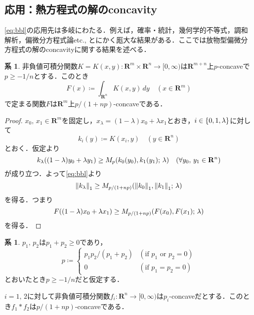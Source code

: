 \documentclass[a4j]{ltjsarticle}
\newcommand{\Rset}{\mathbf{R}}
\newcommand{\1}{\bm{1}}
\newcommand{\M}[4]{M_{#1}\qty(#2,#3;\,#4)}
\numberwithin{equation}{section}
\theoremstyle{definition}
\newtheorem{cor}[thm]{系}
\begin{document}
\subsection{応用：熱方程式の解のconcavity}
\eqref{eq:bbl}の応用先は多岐にわたる．例えば，確率・統計，幾何学的不等式，調和解析，偏微分方程式論etc., とにかく厖大な結果がある．ここでは放物型偏微分方程式の解のconcavityに関する結果を述べる．
\begin{cor}\label{cor:marginal_concavity}
    非負値可積分関数$K=K(x,y)\colon \Rset^m\times \Rset^n\to [0,\infty)$は$\Rset^{m+n}$上$p$-concaveで$p\geq -1/n$とする．このとき
    \begin{equation}
        F(x)\coloneqq \int_{\Rset^n}K(x,y)\,dy\quad (x\in\Rset^m)
    \end{equation}
    で定まる関数$F$は$\Rset^m$上$p/(1+np)$-concaveである．
\end{cor}
\begin{proof}
    $x_0,\,x_1\in \Rset^m$を固定し，$x_\lambda=(1-\lambda)x_0+\lambda x_1$とおき，$i\in \qty{0,1,\lambda}$に対して
    \begin{equation}
        k_i(y)\coloneqq K(x_i,y)\quad (y\in\Rset^n)
    \end{equation}
    とおく．仮定より
    \begin{equation}
        k_{\lambda}((1-\lambda)y_0+\lambda y_1)\geq \M{p}{k_0(y_0)}{k_1(y_1)}{\lambda}\quad (\forall y_0,\,y_1\in\Rset^n)
    \end{equation}
    が成り立つ．よって\eqref{eq:bbl}より
    \begin{equation}
        \norm{k_\lambda}_{1}\geq \M{p/(1+np)}{\norm{k_0}_1}{\norm{k_1}_{1}}{\lambda}
    \end{equation}
    を得る．つまり
    \begin{equation}
        F((1-\lambda)x_0+\lambda x_1)\geq \M{p/(1+np)}{F(x_0)}{F(x_1)}{\lambda}
    \end{equation}
    を得る．
\end{proof}
\begin{cor}\label{cor:conv_concavity}
    $p_1,\,p_2$は$p_1+p_2\geq0$であり，
    \begin{equation}
        p\coloneqq \begin{cases}
            p_1p_2/(p_1+p_2) & (\text{if $p_1$ or $p_2=0$})\\
            0 & (\text{if $p_1=p_2=0$})
        \end{cases}
    \end{equation}
    とおいたとき$p\geq -1/n$だと仮定する．

    $i=1,\,2$に対して非負値可積分関数$f_i\colon \Rset^n\to[0,\infty)$は$p_i$-concaveだとする．このとき$f_1\ast f_2$は$p/(1+np)$-concaveである．
\end{cor}
\end{document}
